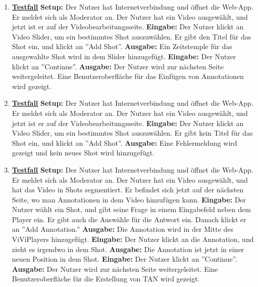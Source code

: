 \begin{enumerate}
	\item \underline{\textbf{Testfall}} \linebreak
	\textbf{Setup:} Der Nutzer hat Internetverbindung und öffnet die Web-App. Er meldet sich als Moderator an. Der Nutzer hat ein Video ausgewählt, und jetzt ist er auf der Videobearbeitungsseite.\linebreak
	\textbf{Eingabe:} Der Nutzer klickt an Video Slider, um ein bestimmtes Shot auszuwählen. Er gibt den Titel für das Shot ein, und klickt an ''Add Shot''. \linebreak
	\textbf{Ausgabe:} Ein Zeitstemple für das ausgewahlte Shot wird in dem Slider hinzugefügt.\linebreak
	\textbf{Eingabe:} Der Nutzer klickt an ''Continue''. \linebreak
	\textbf{Ausgabe:} Der Nutzer wird zur nächsten Seite weitergeleitet. Eine Benutzeroberfläche für das Einfügen von Annotationen wird gezeigt.
	
	\item \underline{\textbf{Testfall}} \linebreak
	\textbf{Setup:} Der Nutzer hat Internetverbindung und öffnet die Web-App. Er meldet sich als Moderator an. Der Nutzer hat ein Video ausgewählt, und jetzt ist er auf der Videobearbeitungsseite.\linebreak
	\textbf{Eingabe:} Der Nutzer klickt an Video Slider, um ein bestimmtes Shot auszuwählen. Er gibt kein Titel für das Shot ein, und klickt an ''Add Shot''. \linebreak
	\textbf{Ausgabe:} Eine Fehlermeldung wird gezeigt und kein neues Shot wird hinzugefügt.
	
	\item \underline{\textbf{Testfall}} \linebreak
	\textbf{Setup:} Der Nutzer hat Internetverbindung und öffnet die Web-App. Er meldet sich als Moderator an. Der Nutzer hat ein Video ausgewählt, und hat das Video in Shots segmentiert. Er befindet sich jetzt auf der nächsten Seite, wo man Annotationen in dem Video hinzufügen kann.\linebreak
	\textbf{Eingabe:} Der Nutzer wählt ein Shot, und gibt seine Frage in einem Eingabefeld neben dem Player ein. Er gibt auch die Auswähle für die Antwort ein. Danach klickt er an ''Add Annotation.''\linebreak
	\textbf{Ausgabe:} Die Annotation wird in der Mitte des ViViPlayers hinzugefügt.\linebreak
	\textbf{Eingabe:} Der Nutzer klickt an die Annotation, und zieht es irgendwo in dem Shot.\linebreak
	\textbf{Ausgabe:} Die Annotation ist jetzt in einer neuen Position in dem Shot.\linebreak
	\textbf{Eingabe:} Der Nutzer klickt an ''Continue''. \linebreak
	\textbf{Ausgabe:} Der Nutzer wird zur nächsten Seite weitergeleitet. Eine Benutzeroberfläche für die Erstellung von TAN wird gezeigt.
	

\end{enumerate}
